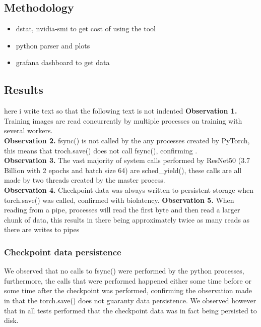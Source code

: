 \documentclass[conference]{IEEEtran}
\begin{document}
\subsection{Methodology}

\begin{itemize}
	\item dstat, nvidia-smi to get cost of using the tool
	\item python parser and plots
	\item grafana dashboard to get data
\end{itemize}



\subsection{Results}

here i write text so that the following text is not indented
\textbf{Observation 1.} Training images are read concurrently by multiple processes on training with several workers.
\\
\textbf{Observation 2.} fsync() is not called by the any processes created by PyTorch, this means that troch.save() does not call fsync(), confirming \cite{checkfreq}.
\\
\textbf{Observation 3.} The vast majority of system calls performed by ResNet50 (3.7 Billion with 2 epochs and batch size 64) are sched\_yield(), these calls are all made by
two threads created by the master process.
\\
\textbf{Observation 4.} Checkpoint data was always written to persistent storage when torch.save() was called, confirmed with biolatency.
\textbf{Observation 5.} When reading from a pipe, processes will read the first byte and then read a larger chunk of data, this results in there being approximately twice as many reads as there are writes to pipes

\subsubsection{Checkpoint data persistence}
We observed that no calls to fsync() were performed by the python processes, furthermore, the calls that were performed happened either some time before or some time after the checkpoint was performed, confirming the observation made in \cite{checkfreq} that the torch.save() does not guaranty data persistence.
We observed however that in all tests performed that the checkpoint data was in fact being persisted to disk.
\end{document}
